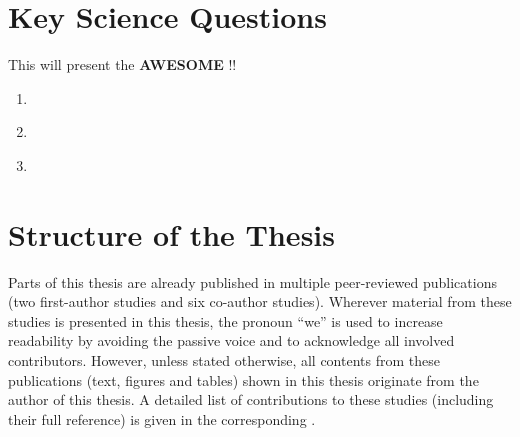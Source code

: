 \section{Key Science Questions}
\label{sec:01:key_science_questions}

This  will present the \textbf{AWESOME}
!!

\begingroup
{}
\begin{enumerate}
  \item \label{enum:01:question_1} \KeyScienceQuestionOne{}
  \item \label{enum:01:question_2} \KeyScienceQuestionTwo{}
  \item \label{enum:01:question_3} \KeyScienceQuestionThree{}
\end{enumerate}
\endgroup


\section{Structure of the Thesis}
\label{sec:01:structure}

Parts of this thesis are already published in multiple peer-reviewed
publications (two first-author studies and six co-author studies). Wherever
material from these studies is presented in this thesis, the pronoun
\enquote{we} is used to increase readability by avoiding the passive voice and
to acknowledge all involved contributors. However, unless stated otherwise, all
contents from these publications (text, figures and tables) shown in this
thesis originate from the author of this thesis. A detailed list of
contributions to these studies (including their full reference) is given in the
corresponding .

